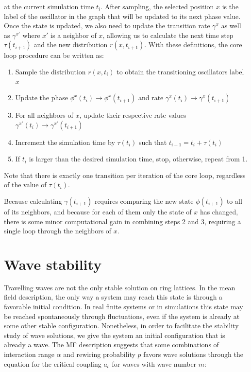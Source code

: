 \noindent at the current simulation time $t_i$. After sampling, the selected position $x$ is the label of the oscillator in the graph
that will be updated to its next phase value. Once the state is updated, we also need to update the transition rate $\gamma^x$ as well
as $\gamma^{x'}$ where $x'$ is a neighbor of $x$, allowing us to calculate the next time step $\tau(t_{i+1})$ and the new distribution
$r(x,t_{i+1})$. With these definitions, the core loop procedure can be written as:

\begin{enumerate}
	\item Sample the distribution $r(x,t_i)$ to obtain the transitioning oscillators label $x$
	\item Update the phase $\phi^x(t_i) \to \phi^x(t_{i+1})$ and rate $\gamma^x(t_i) \to \gamma^x(t_{i+1})$
	\item For all neighbors of $x$, update their respective rate values $\gamma^{x'}(t_i) \to \gamma^{x'}(t_{i+1})$
	\item Increment the simulation time by $\tau(t_i)$ such that $t_{i+1} = t_i + \tau(t_i)$
	\item If $t_{i}$ is larger than the desired simulation time, stop, otherwise, repeat from 1.
\end{enumerate}

Note that there is exactly one transition per iteration of the core loop, regardless of the value of $\tau(t_i)$.

Because calculating $\gamma(t_{i+1})$ requires comparing the new state $\phi(t_{i+1})$ to all of its neighbors, and because for each of
them only the state of $x$ has changed, there is some minor computational gain in combining steps 2 and 3, requiring a single loop
through the neighbors of $x$.

\section{Wave stability}

Travelling waves are not the only stable solution on ring lattices. In the mean field description, the only way a system may reach this
state is through a favorable initial condition. In real finite systems or in simulations this state may be reached spontaneously
through fluctuations, even if the system is already at some other stable configuration. Nonetheless, in order to facilitate the
stability study of wave solutions, we give the system an initial configuration that is already a wave. The MF description suggests that
some combinations of interaction range $\alpha$ and rewiring probability $p$ favors wave solutions through the equation for the
critical coupling $a_c$ for waves with wave number $m$:

